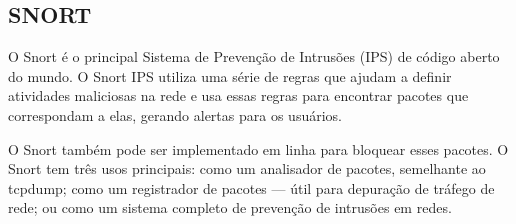 \subsection{SNORT}

O Snort é o principal Sistema de Prevenção de Intrusões (IPS) de código aberto do mundo. O Snort IPS utiliza uma série de regras que ajudam a definir atividades maliciosas na rede e usa essas regras para encontrar pacotes que correspondam a elas, gerando alertas para os usuários.

O Snort também pode ser implementado em linha para bloquear esses pacotes. O Snort tem três usos principais: como um analisador de pacotes, semelhante ao tcpdump; como um registrador de pacotes — útil para depuração de tráfego de rede; ou como um sistema completo de prevenção de intrusões em redes. 